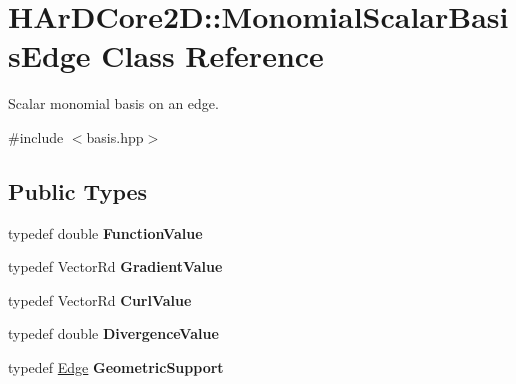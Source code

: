 \hypertarget{classHArDCore2D_1_1MonomialScalarBasisEdge}{}\section{H\+Ar\+D\+Core2D\+:\+:Monomial\+Scalar\+Basis\+Edge Class Reference}
\label{classHArDCore2D_1_1MonomialScalarBasisEdge}


Scalar monomial basis on an edge.  




{\ttfamily \#include $<$basis.\+hpp$>$}

\subsection*{Public Types}
\begin{DoxyCompactItemize}
\item 
\mbox{\label{classHArDCore2D_1_1MonomialScalarBasisEdge_af889760ab19dd5bd19e8780fe4378d25}} 
typedef double {\bfseries Function\+Value}
\item 
\mbox{\label{classHArDCore2D_1_1MonomialScalarBasisEdge_ac660ec4df6c23e7d383d2ccc5f06935b}} 
typedef Vector\+Rd {\bfseries Gradient\+Value}
\item 
\mbox{\label{classHArDCore2D_1_1MonomialScalarBasisEdge_a0e51387f5ec1db65ed5f6a744026a6a2}} 
typedef Vector\+Rd {\bfseries Curl\+Value}
\item 
\mbox{\label{classHArDCore2D_1_1MonomialScalarBasisEdge_a9ddce9d9620387e1273d1f71f7cd4f8f}} 
typedef double {\bfseries Divergence\+Value}
\item 
\mbox{\label{classHArDCore2D_1_1MonomialScalarBasisEdge_af296f0d9a155a2d4599512f96b3967cf}} 
typedef \hyperlink{classHArDCore2D_1_1Edge}{Edge} {\bfseries Geometric\+Support}
\end{DoxyCompactItemize}
